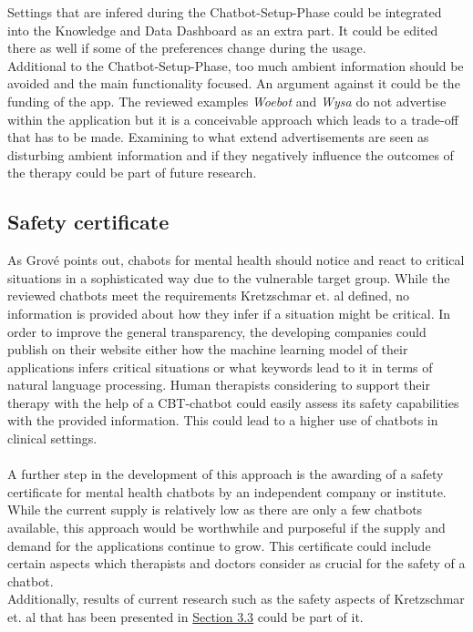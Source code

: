 \documentclass[sigconf, nonacm]{acmart}
\begin{document}
Settings that are infered during the Chatbot-Setup-Phase could be integrated into the Knowledge and Data Dashboard as an extra part. It could be edited there as well if some of the preferences change during the usage.
\\
Additional to the Chatbot-Setup-Phase, too much ambient information should be avoided and the main functionality focused. An argument against it could be the funding of the app. The reviewed examples \emph{Woebot} and \emph{Wysa} do not advertise within the application but it is a conceivable approach which leads 
to a trade-off that has to be made. Examining to what extend advertisements are seen as disturbing ambient information and if they negatively influence the outcomes of the therapy could be part of future research. 
\\
\subsection{Safety certificate}
\label{sec:four_three}
As Grové \cite{Grove2021} points out, chabots for mental health should notice and react to critical situations in a sophisticated way due to the vulnerable target group. While the reviewed chatbots meet the requirements Kretzschmar et. al \cite{Kretzschmar2019} defined,
no information is provided about how they infer if a situation might be critical. In order to improve the general transparency, the developing companies could publish on their website either how the machine learning model of their applications infers 
critical situations or what keywords lead to it in terms of natural language processing. Human therapists considering to support their therapy with the help of a CBT-chatbot could easily assess its safety capabilities with the provided information. This could lead to a higher use of chatbots in clinical settings.\\
\\
A further step in the development of this approach is the awarding of a safety certificate for mental health chatbots by an independent company or institute. While the current supply is relatively low as there are only a few chatbots available, this approach would be worthwhile and purposeful if the supply and demand for the applications continue to grow. 
This certificate could include certain aspects which therapists and doctors consider as crucial for the safety of a chatbot.\\ 
Additionally, results of current research such as the safety aspects of Kretzschmar et. al \cite{Kretzschmar2019} that has been presented in \hyperref[sec:three_three]{Section 3.3} could be part of it.  
\end{document}
